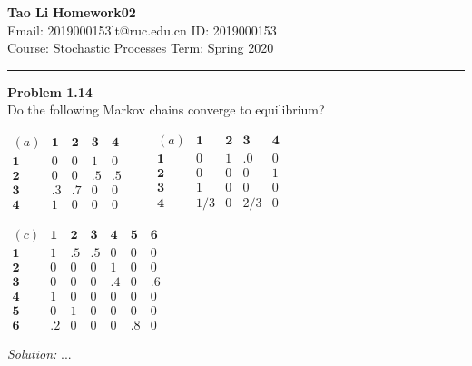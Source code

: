 \documentclass[a4paper, 11pt]{article}
\newenvironment{problem}[2][Problem]
    { \begin{mdframed}[backgroundcolor=gray!20] \textbf{#1 #2} \\}
    {  \end{mdframed}}
\newenvironment{solution}
    {\textit{Solution:}}
    {}
\begin{document}
\noindent
\large\textbf{Tao Li} \hfill \textbf{Homework02}   \\
Email: 2019000153lt@ruc.edu.cn \hfill ID: 2019000153 \\
\normalsize Course: Stochastic Processes \hfill Term: Spring 2020\\
\noindent\rule{7in}{2.8pt}
\begin{problem}{1.14}
    Do the following Markov chains converge to equilibrium?
    \begin{center}
        $
         \begin{matrix}
            (a) & \bm{1} & \bm{2} & \bm{3} & \bm{4} \\
            \bm{1} & 0 & 0 & 1 & 0 \\
            \bm{2} & 0 & 0 & .5 & .5 \\
            \bm{3} & .3 & .7 & 0 & 0\\
            \bm{4} & 1 & 0 & 0 & 0
        \end{matrix}
        \qquad
        \begin{matrix}
            (a) & \bm{1} & \bm{2} & \bm{3} & \bm{4} \\
            \bm{1} & 0 & 1 & .0 & 0 \\
            \bm{2} & 0 & 0 & 0 & 1 \\
            \bm{3} & 1 & 0 & 0 & 0\\
            \bm{4} & 1/3 & 0 & 2/3 & 0
        \end{matrix}
        $
    \end{center}

    \begin{center}
        $       
       \begin{matrix}
           (c) & \bm{1} & \bm{2} & \bm{3} & \bm{4} & \bm{5} & \bm{6}\\
           \bm{1} & 1 & .5 & .5 & 0 & 0 & 0\\
           \bm{2} & 0 & 0 & 0 & 1 & 0 & 0\\
           \bm{3} & 0 & 0 & 0 & .4 & 0 & .6\\
           \bm{4} & 1 & 0 & 0 & 0 & 0 & 0\\
           \bm{5} & 0 & 1 & 0 & 0 & 0 & 0\\
           \bm{6} & .2 & 0 & 0 & 0 & .8 & 0
           \end{matrix}
           $
   \end{center}
\end{problem}
\begin{solution}   
...
\end{solution}
\end{document}
